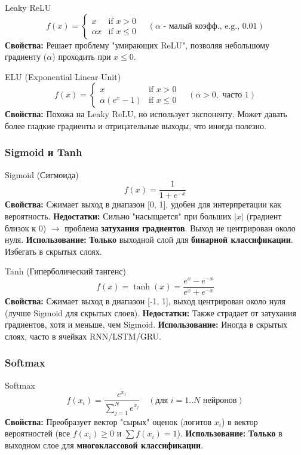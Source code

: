 \begin{myexampleblock}{Leaky ReLU}
    \[ f(x) = \begin{cases} x & \text{if } x > 0 \\ \alpha x & \text{if } x \le 0 \end{cases} \quad (\alpha \text{ - малый коэфф., e.g., } 0.01) \]
    \textbf{Свойства:} Решает проблему "умирающих ReLU", позволяя небольшому градиенту ($\alpha$) проходить при $x \le 0$.
\end{myexampleblock}

\begin{myexampleblock}{ELU (Exponential Linear Unit)}
     \[ f(x) = \begin{cases} x & \text{if } x > 0 \\ \alpha (e^x - 1) & \text{if } x \le 0 \end{cases} \quad (\alpha > 0, \text{ часто } 1) \]
    \textbf{Свойства:} Похожа на Leaky ReLU, но использует экспоненту. Может давать более гладкие градиенты и отрицательные выходы, что иногда полезно.
\end{myexampleblock}

\subsubsection{Sigmoid и Tanh}
\begin{myexampleblock}{Sigmoid (Сигмоида)}
    \[ f(x) = \frac{1}{1 + e^{-x}} \]
    \textbf{Свойства:} Сжимает выход в диапазон [0, 1], удобен для интерпретации как вероятность.
    \textbf{Недостатки:} Сильно "насыщается" при больших $|x|$ (градиент близок к 0) $\rightarrow$ проблема \textbf{затухания градиентов}. Выход не центрирован около нуля.
    \textbf{Использование:} \textbf{Только} выходной слой для \textbf{бинарной классификации}. Избегать в скрытых слоях.
\end{myexampleblock}

\begin{myexampleblock}{Tanh (Гиперболический тангенс)}
    \[ f(x) = \tanh(x) = \frac{e^x - e^{-x}}{e^x + e^{-x}} \]
    \textbf{Свойства:} Сжимает выход в диапазон [-1, 1], выход центрирован около нуля (лучше Sigmoid для скрытых слоев).
    \textbf{Недостатки:} Также страдает от затухания градиентов, хотя и меньше, чем Sigmoid.
    \textbf{Использование:} Иногда в скрытых слоях, часто в ячейках RNN/LSTM/GRU.
\end{myexampleblock}

\subsubsection{Softmax}
\begin{myexampleblock}{Softmax}
    \[ f(x_i) = \frac{e^{x_i}}{\sum_{j=1}^{N} e^{x_j}} \quad (\text{для } i=1..N \text{ нейронов}) \]
    \textbf{Свойства:} Преобразует вектор "сырых" оценок (логитов $x_i$) в вектор вероятностей (все $f(x_i) \ge 0$ и $\sum f(x_i) = 1$).
    \textbf{Использование:} \textbf{Только} в выходном слое для \textbf{многоклассовой классификации}.
\end{myexampleblock}

